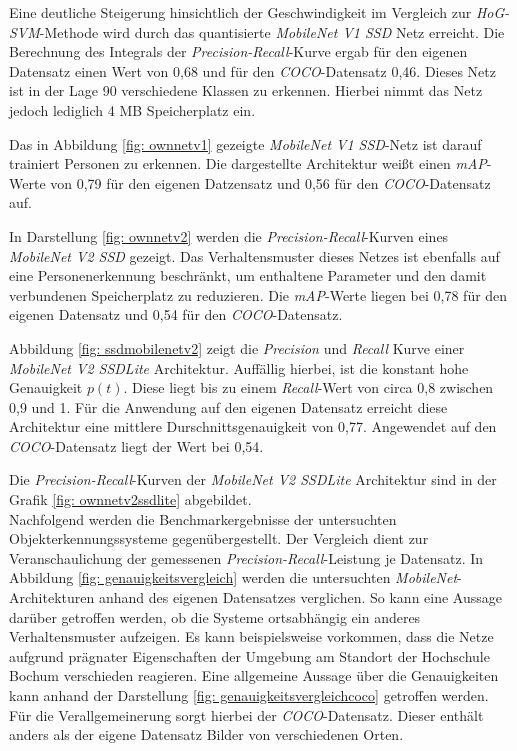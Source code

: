 

Eine deutliche Steigerung hinsichtlich der Geschwindigkeit im Vergleich zur \textit{HoG-SVM}-Methode wird durch das quantisierte \textit{MobileNet V1 SSD} Netz erreicht. Die Berechnung des Integrals der \textit{Precision-Recall}-Kurve ergab für den eigenen Datensatz einen Wert von 0,68 und für den \textit{COCO}-Datensatz 0,46. Dieses Netz ist in der Lage 90 verschiedene Klassen zu erkennen. Hierbei nimmt das Netz jedoch lediglich 4 MB Speicherplatz ein.



Das in Abbildung \ref{fig: ownnetv1} gezeigte \textit{MobileNet V1 SSD}-Netz ist darauf trainiert Personen zu erkennen. Die dargestellte Architektur weißt einen \textit{mAP}-Werte von 0,79 für den eigenen Datzensatz und 0,56 für den \textit{COCO}-Datensatz auf.



In Darstellung \ref{fig: ownnetv2} werden die \textit{Precision-Recall}-Kurven eines \textit{MobileNet V2 SSD} gezeigt. Das Verhaltensmuster dieses Netzes ist ebenfalls auf eine Personenerkennung beschränkt, um enthaltene Parameter und den damit verbundenen Speicherplatz zu reduzieren. Die \textit{mAP}-Werte liegen bei 0,78 für den eigenen Datensatz und 0,54 für den \textit{COCO}-Datensatz. 



Abbildung \ref{fig: ssdmobilenetv2} zeigt die \textit{Precision} und \textit{Recall} Kurve einer \textit{MobileNet V2 SSDLite} Architektur. Auffällig hierbei, ist die konstant hohe Genauigkeit $p(t)$. Diese liegt bis zu einem \textit{Recall}-Wert von circa 0,8 zwischen 0,9 und 1. Für die Anwendung auf den eigenen Datensatz erreicht diese Architektur eine mittlere Durschnittsgenauigkeit von 0,77. Angewendet auf den \textit{COCO}-Datensatz liegt der Wert bei 0,54. 

 

 
  
Die \textit{Precision-Recall}-Kurven der \textit{MobileNet V2 SSDLite} Architektur sind in der Grafik \ref{fig: ownnetv2ssdlite} abgebildet. \\

Nachfolgend werden die Benchmarkergebnisse der untersuchten Objekterkennungssysteme gegenübergestellt. Der Vergleich dient zur Veranschaulichung der gemessenen \textit{Precision-Recall}-Leistung je Datensatz. In Abbildung \ref{fig: genauigkeitsvergleich} werden die untersuchten \textit{MobileNet}-Architekturen anhand des eigenen Datensatzes verglichen. So kann eine Aussage darüber getroffen werden, ob die Systeme ortsabhängig ein anderes Verhaltensmuster aufzeigen. Es kann beispielsweise vorkommen, dass die Netze aufgrund prägnater Eigenschaften der Umgebung am Standort der Hochschule Bochum verschieden reagieren. Eine allgemeine Aussage über die Genauigkeiten kann anhand der Darstellung \ref{fig: genauigkeitsvergleichcoco} getroffen werden. Für die Verallgemeinerung sorgt hierbei der \textit{COCO}-Datensatz. Dieser enthält anders als der eigene Datensatz Bilder von verschiedenen Orten.     


